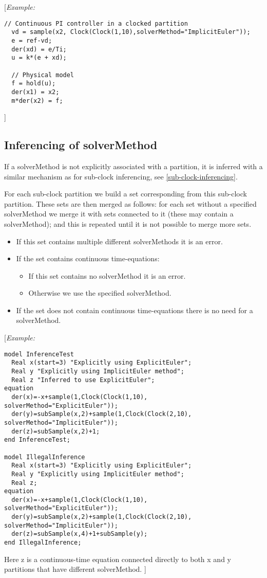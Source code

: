 {[}\emph{Example:}
\begin{lstlisting}[language=modelica]
  // Continuous PI controller in a clocked partition
  vd = sample(x2, Clock(Clock(1,10),solverMethod="ImplicitEuler"));
  e = ref-vd;
  der(xd) = e/Ti;
  u = k*(e + xd);

  // Physical model
  f = hold(u);
  der(x1) = x2;
  m*der(x2) = f;
\end{lstlisting}
{]}

\subsection{Inferencing of solverMethod}

If a solverMethod is not explicitly associated with a partition, it is
inferred with a similar mechanism as for sub-clock inferencing, see
\autoref{sub-clock-inferencing}. 

For each sub-clock partition we build a set corresponding from this sub-clock partition.
These sets are then merged as follows: for each set without a specified solverMethod we merge it 
with sets connected to it (these may contain a solverMethod); and this is repeated until it is not possible to merge more sets.

\begin{itemize}
\item If this set contains multiple different solverMethods it is an error.
\item If the set contains continuous time-equations:
\begin{itemize} 
\item If this set contains no solverMethod it is an error.
\item Otherwise we use the specified solverMethod.
\end{itemize}
\item If the set does not contain continuous time-equations there is no need for a solverMethod.
\end{itemize}

{[}\emph{Example:}

\begin{lstlisting}[language=modelica]
model InferenceTest
  Real x(start=3) "Explicitly using ExplicitEuler";
  Real y "Explicitly using ImplicitEuler method";
  Real z "Inferred to use ExplicitEuler";
equation 
  der(x)=-x+sample(1,Clock(Clock(1,10), solverMethod="ExplicitEuler"));
  der(y)=subSample(x,2)+sample(1,Clock(Clock(2,10), solverMethod="ImplicitEuler"));
  der(z)=subSample(x,2)+1;
end InferenceTest;

model IllegalInference
  Real x(start=3) "Explicitly using ExplicitEuler";
  Real y "Explicitly using ImplicitEuler method";
  Real z;
equation 
  der(x)=-x+sample(1,Clock(Clock(1,10), solverMethod="ExplicitEuler"));
  der(y)=subSample(x,2)+sample(1,Clock(Clock(2,10), solverMethod="ImplicitEuler"));
  der(z)=subSample(x,4)+1+subSample(y);
end IllegalInference;
\end{lstlisting}
Here z is a continuous-time equation connected directly to both x and y partitions that have different solverMethod.
{]}

